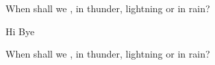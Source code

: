 \documentclass{article}
\begin{document}
When shall we , in thunder, lightning or in rain?

Hi  Bye

\StopCensoring
When shall we , in thunder, lightning or in rain?
\end{document}
